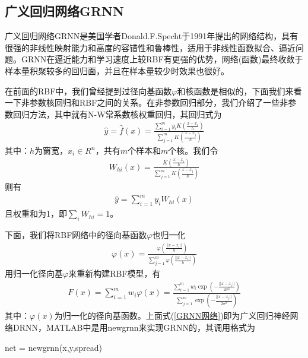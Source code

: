 {    \subsection{广义回归网络GRNN}
        \par
        广义回归网络GRNN是美国学者Donald.F.Specht于1991年提出的网络结构，具有很强的非线性映射能力和高度的容错性和鲁棒性，适用于非线性函数拟合、逼近问题。GRNN在逼近能力和学习速度上较RBF有更强的优势，网络(函数)最终收敛于样本量积聚较多的回归面，并且在样本量较少时效果也很好。
        \par
        在前面的RBF中，我们曾经提到过径向基函数$\varphi$和核函数是相似的，下面我们来看一下非参数核回归和RBF之间的关系。在非参数回归部分，我们介绍了一些非参数回归方法，其中就有N-W常系数核权重回归，其回归式为
        \begin{align*}
        \hat{y} = \hat{f}(x) = \frac{\sum\limits_{i=1}^m y_i K \left( \frac{x-x_i}{h} \right)  }{\sum\limits_{j=1}^m  K \left( \frac{x-x_j}{h} \right) }
        \end{align*}
        其中：$h$为窗宽，$x_i\in R^n$，共有$m$个样本和$m$个核。我们令
        \begin{align*}
        W_{hi}(x) = \frac{K \left( \frac{x-x_i}{h} \right)}{\sum\limits_{j=1}^m K \left( \frac{x-x_j}{h} \right)}
        \end{align*}
        则有
        \begin{align}
        \label{NW非参数回归}
        \hat{y} = \sum_{i=1}^m y_i W_{hi}(x)
        \end{align}
        且权重和为1，即$\sum_i W_{hi} = 1$。
        \par
        下面，我们将RBF网络中的径向基函数$\varphi$也归一化
        \begin{align*}
        \varphi(x) = \frac{\varphi \left( \frac{||x-x_i||}{h} \right)   }{\sum\limits_{j=1}^m \varphi \left( \frac{||x-x_i||}{h} \right)}
        \end{align*}
        用归一化径向基$\varphi$来重新构建RBF模型，有
        \begin{align}
        \label{GRNN网络}
        F(x) = \sum_{i=1}^m w_i \varphi(x) = \frac{\sum\limits_{i=1}^m w_i \exp \left( -\frac{||x-x_i||}{2\sigma^2} \right)  }{\sum\limits_{j=1}^m \exp \left( -\frac{||x-x_j||}{2\sigma^2} \right) }
        \end{align}
        其中：$\varphi(x)$为归一化的径向基函数。上面式(\ref{GRNN网络})即为广义回归神经网络DRNN，MATLAB中是用newgrnn来实现GRNN的，其调用格式为
        \par
        net = newgrnn(x,y,spread)

}
